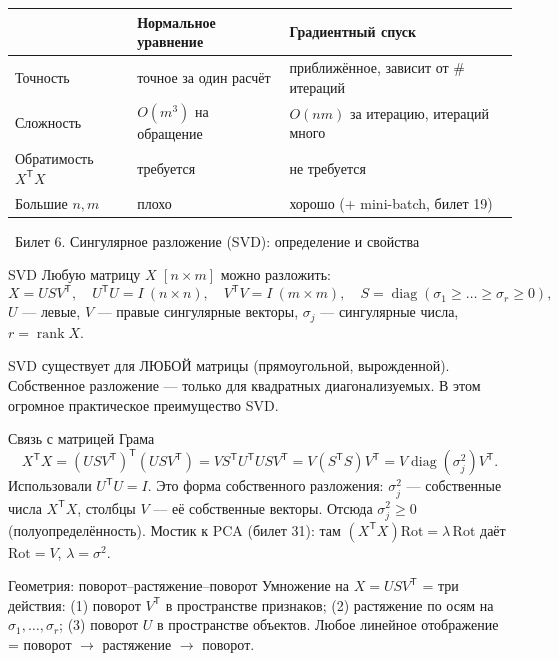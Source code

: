\documentclass[12pt, a4paper]{article}
\newcommand{\bilet}[2]{%
  \vspace{10pt}%
  \noindent\colorbox{qcolor}{\parbox{\dimexpr\linewidth-2\fboxsep\relax}{%
    \color{white}\large\bfseries\strut\ Билет #1. #2%
  }}%
  \nopagebreak\vspace{5pt}\par\nopagebreak%
}
\newcommand{\rank}{\operatorname{rank}}
\newcommand{\diag}{\operatorname{diag}}
\newcommand{\tr}{^{\mathsf{T}}}
\begin{document}
\begin{table}[h]\centering\small
\begin{tabular}{@{}lll@{}}
\toprule
 & Нормальное уравнение & Градиентный спуск\\
\midrule
Точность & точное за один расчёт & приближённое, зависит от \# итераций\\
Сложность & $O(m^3)$ на обращение & $O(nm)$ за итерацию, итераций много\\
Обратимость $X\tr X$ & требуется & не требуется\\
Большие $n, m$ & плохо & хорошо (+ mini-batch, билет 19)\\
\bottomrule
\end{tabular}
\end{table}

\bilet{6}{Сингулярное разложение (SVD): определение и свойства}

\begin{defbox}{SVD}
Любую матрицу $X$ $[n\times m]$ можно разложить:
\[
  X = U S V\tr, \quad U\tr U = I\ (n\times n),\quad V\tr V = I\ (m\times m),\quad S = \diag(\sigma_1 \ge \dots \ge \sigma_r \ge 0),
\]
$U$ --- левые, $V$ --- правые сингулярные векторы, $\sigma_j$ --- сингулярные числа, $r = \rank X$.
\end{defbox}

\begin{rembox}{}
SVD существует для ЛЮБОЙ матрицы (прямоугольной, вырожденной). Собственное разложение --- только для квадратных диагонализуемых. В этом огромное практическое преимущество SVD.
\end{rembox}

\begin{proofbox}{Связь с матрицей Грама}
\[
  X\tr X = (USV\tr)\tr(USV\tr) = V S\tr U\tr U S V\tr = V(S\tr S)V\tr = V\diag(\sigma_j^2)V\tr.
\]
Использовали $U\tr U = I$. Это форма собственного разложения: $\sigma_j^2$ --- собственные числа $X\tr X$, столбцы $V$ --- её собственные векторы. Отсюда $\sigma_j^2 \ge 0$ (полуопределённость). Мостик к PCA (билет 31): там $(X\tr X)\text{Rot} = \lambda\,\text{Rot}$ даёт $\text{Rot} = V$, $\lambda = \sigma^2$.
\end{proofbox}

\begin{propbox}{Геометрия: поворот--растяжение--поворот}
Умножение на $X = USV\tr$ = три действия: (1) поворот $V\tr$ в пространстве признаков; (2) растяжение по осям на $\sigma_1, \ldots, \sigma_r$; (3) поворот $U$ в пространстве объектов. Любое линейное отображение = поворот $\to$ растяжение $\to$ поворот.
\end{propbox}
\end{document}
